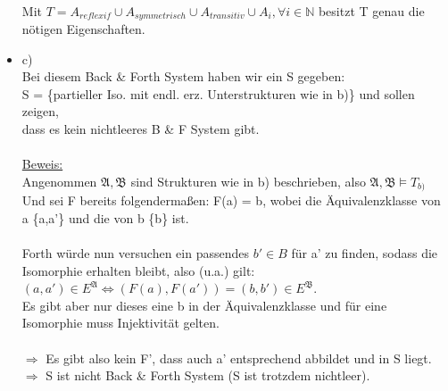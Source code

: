 \documentclass[a4paper]{scrartcl}
\begin{document}
\begin{itemize}
            \\Mit $T = A_{reflexif} \cup A_{symmetrisch} \cup A_{transitiv} \cup A_i, \forall i \in \mathds{N}$ besitzt T genau die nötigen Eigenschaften.\\

        \item c)\\
            Bei diesem Back \& Forth System haben wir ein S gegeben:\\
            S = \{partieller Iso. mit endl. erz. Unterstrukturen wie in b)\} und sollen zeigen,\\
            dass es kein nichtleeres B \& F System gibt.\\

           \\\underline{Beweis:}\\
            Angenommen $\mathfrak{A}, \mathfrak{B}$ sind Strukturen wie in b) beschrieben, also $\mathfrak{A}, \mathfrak{B} \models T_{b)}$\\
            Und sei F bereits folgendermaßen: F(a) = b, wobei die Äquivalenzklasse von a \{a,a'\} und die von b \{b\} ist.\\

            \\Forth würde nun versuchen ein passendes $b' \in B$ für a' zu finden, sodass die Isomorphie erhalten bleibt, also (u.a.) gilt:\\
            $(a, a') \in E^{\mathfrak{A}} \Leftrightarrow (F(a),F(a')) = (b, b') \in E^{\mathfrak{B}}$.\\
            Es gibt aber nur dieses eine b in der Äquivalenzklasse und für eine Isomorphie muss Injektivität gelten.\\
            \\$\Rightarrow$ Es gibt also kein F', dass auch a' entsprechend abbildet und in S liegt.\\
            $\Rightarrow$ S ist nicht Back \& Forth System (S ist trotzdem nichtleer).



    \end{itemize}


\section*{}%
\label{sec:aufgabe_3}
\end{document}
